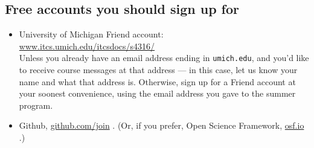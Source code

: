 \documentclass[12pt]{article}
\begin{document}
 \subsection{Free accounts you should sign up for}

 \begin{itemize}
 \item University of Michigan Friend account:\\
\url{www.itcs.umich.edu/itcsdocs/s4316/}\\
Unless you already have an email address ending in
\texttt{umich.edu}, and you'd like to receive course messages at that
address --- in this case, let us know your name and what that address
is.  Otherwise, sign up for a Friend account at your soonest convenience, using the email address
you gave to the summer program. 
\item Github, \url{github.com/join} . (Or, if you prefer, Open Science
  Framework, \url{osf.io} .)
 \end{itemize}

\end{document}

